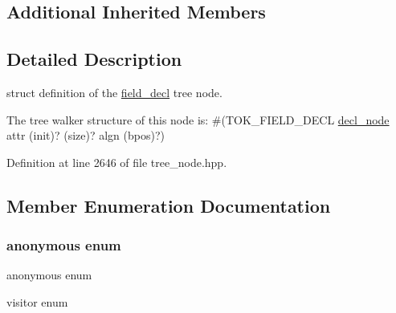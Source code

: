 \subsection*{Additional Inherited Members}


\subsection{Detailed Description}
struct definition of the \hyperlink{structfield__decl}{field\+\_\+decl} tree node. 

The tree walker structure of this node is\+: \#(T\+O\+K\+\_\+\+F\+I\+E\+L\+D\+\_\+\+D\+E\+CL \hyperlink{structdecl__node}{decl\+\_\+node} attr (init)? (size)? algn (bpos)?) 

Definition at line 2646 of file tree\+\_\+node.\+hpp.



\subsection{Member Enumeration Documentation}
\mbox{\label{structfield__decl_a3bf55db40e3c3cdc72ba40f5d07823b4}} 
\subsubsection{\texorpdfstring{anonymous enum}{anonymous enum}}
{\footnotesize\ttfamily anonymous enum}



visitor enum 

